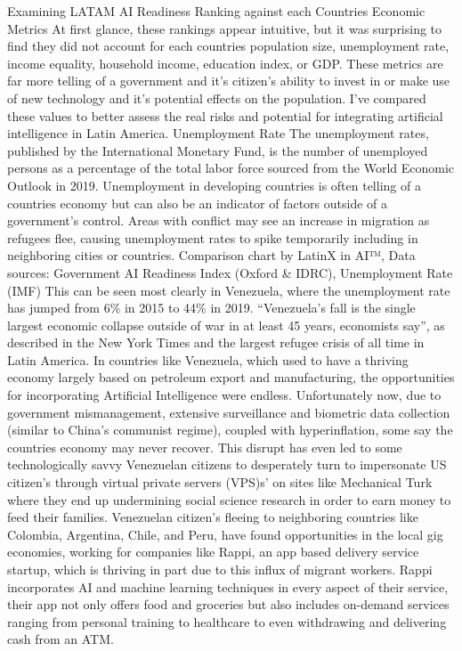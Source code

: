 \documentclass[journal]{IEEEtran}
\begin{document}
Examining LATAM AI Readiness Ranking against each Countries Economic Metrics
At first glance, these rankings appear intuitive, but it was surprising to find they did not account for each countries population size, unemployment rate, income equality, household income, education index, or GDP. These metrics are far more telling of a government and it’s citizen’s ability to invest in or make use of new technology and it’s potential effects on the population. I’ve compared these values to better assess the real risks and potential for integrating artificial intelligence in Latin America.
Unemployment Rate
The unemployment rates, published by the International Monetary Fund, is the number of unemployed persons as a percentage of the total labor force sourced from the World Economic Outlook in 2019. Unemployment in developing countries is often telling of a countries economy but can also be an indicator of factors outside of a government’s control. Areas with conflict may see an increase in migration as refugees flee, causing unemployment rates to spike temporarily including in neighboring cities or countries.
Comparison chart by LatinX in AI™, Data sources: Government AI Readiness Index (Oxford \& IDRC), Unemployment Rate (IMF)
This can be seen most clearly in Venezuela, where the unemployment rate has jumped from 6\% in 2015 to 44\% in 2019. “Venezuela’s fall is the single largest economic collapse outside of war in at least 45 years, economists say”, as described in the New York Times and the largest refugee crisis of all time in Latin America. In countries like Venezuela, which used to have a thriving economy largely based on petroleum export and manufacturing, the opportunities for incorporating Artificial Intelligence were endless. Unfortunately now, due to government mismanagement, extensive surveillance and biometric data collection (similar to China’s communist regime), coupled with hyperinflation, some say the countries economy may never recover.
This disrupt has even led to some technologically savvy Venezuelan citizens to desperately turn to impersonate US citizen’s through virtual private servers (VPS)s’ on sites like Mechanical Turk where they end up undermining social science research in order to earn money to feed their families. Venezuelan citizen’s fleeing to neighboring countries like Colombia, Argentina, Chile, and Peru, have found opportunities in the local gig economies, working for companies like Rappi, an app based delivery service startup, which is thriving in part due to this influx of migrant workers. Rappi incorporates AI and machine learning techniques in every aspect of their service, their app not only offers food and groceries but also includes on-demand services ranging from personal training to healthcare to even withdrawing and delivering cash from an ATM.
\end{document}
